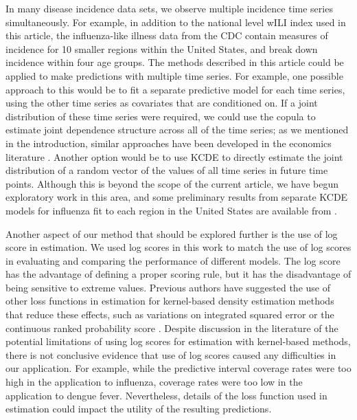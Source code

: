 \documentclass[times, doublespace]{simauth}\usepackage[]{graphicx}\usepackage[]{color}
\begin{document}
In many disease incidence data sets, we observe multiple incidence
time series simultaneously.  For example, in addition to the national level
wILI index used in this article, the influenza-like illness data from the CDC
contain measures of incidence for 10 smaller regions within the United States,
and break down incidence within four age groups.  The methods described in
this article could be applied to make predictions with multiple time series.
For example, one possible approach to this would be to fit a separate predictive model for
each time series, using the other time series as covariates that are conditioned on.
If a joint distribution of these time series were required, we could use the
copula to estimate joint dependence structure across all of the time series; as
we mentioned in the introduction, similar approaches have been developed in the
economics literature \cite{patton2012reviewCopulaEconomicTimeSeries}.
Another option would be to use KCDE to directly estimate the joint distribution
of a random vector of the values of all time series in future time points.
Although this is beyond the scope of the current article, we have begun
exploratory work in this area, and some preliminary results from separate KCDE
models for influenza fit to each region in the United States are available from \cite{ReichLabFluSight}.

Another aspect of our method that should be explored further is the use of
log score in estimation.  We used log scores in this work to match the use
of log scores in evaluating and comparing the performance of different models.
The log score has the advantage of defining a proper scoring
rule, but it has the disadvantage of being sensitive to extreme values.
Previous authors have suggested the use of other loss functions in estimation
for kernel-based density estimation methods that reduce these effects, such as
variations on integrated squared error
\cite{fan2004crossvalidationKCDE} or the continuous ranked probability
score \cite{jeon2012KCDEWindPower}.  Despite discussion in the literature of the
potential limitations of using log scores for estimation with kernel-based methods,
there is not conclusive evidence that use of log scores caused any difficulties
in our application. For example, while the predictive interval coverage rates
were too high in the application to influenza, coverage rates were too low in
the application to dengue fever.  Nevertheless, details of the loss function
used in estimation could impact the utility of the resulting predictions.
\end{document}

